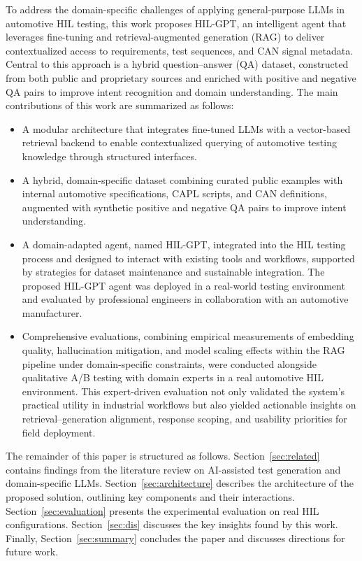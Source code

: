 \documentclass[a4paper,fleqn]{cas-dc}
\begin{document}
To address the domain-specific challenges of applying general-purpose LLMs in automotive HIL testing, this work proposes HIL-GPT, an intelligent agent that leverages fine-tuning and retrieval-augmented generation (RAG) to deliver contextualized access to requirements, test sequences, and CAN signal metadata. Central to this approach is a hybrid question–answer (QA) dataset, constructed from both public and proprietary sources and enriched with positive and negative QA pairs to improve intent recognition and domain understanding. The main contributions of this work are summarized as follows:
\begin{itemize}
    \item A modular architecture that integrates fine-tuned LLMs with a vector-based retrieval backend to enable contextualized querying of automotive testing knowledge through structured interfaces.
    
    \item A hybrid, domain-specific dataset combining curated public examples with internal automotive specifications, CAPL scripts, and CAN definitions, augmented with synthetic positive and negative QA pairs to improve intent understanding.
    
    \item A domain-adapted agent, named HIL-GPT, integrated into the HIL testing process and designed to interact with existing tools and workflows, supported by strategies for dataset maintenance and sustainable integration. The proposed HIL-GPT agent was deployed in a real-world testing environment and evaluated by professional engineers in collaboration with an automotive manufacturer.
    
    \item Comprehensive evaluations, combining empirical measurements of embedding quality, hallucination mitigation, and model scaling effects within the RAG pipeline under domain-specific constraints, were conducted alongside qualitative A/B testing with domain experts in a real automotive HIL environment. This expert-driven evaluation not only validated the system’s practical utility in industrial workflows but also yielded actionable insights on retrieval–generation alignment, response scoping, and usability priorities for field deployment.
\end{itemize}


The remainder of this paper is structured as follows. Section~\ref{sec:related}  contains findings from the literature review on AI-assisted test generation and domain-specific LLMs. Section~\ref{sec:architecture} describes the architecture of the proposed solution, outlining key components and their interactions.  Section~\ref{sec:evaluation} presents the experimental evaluation on real HIL configurations. Section~\ref{sec:dis} discusses the key insights found by this work. Finally, Section~\ref{sec:summary} concludes the paper and discusses directions for future work.
\end{document}
